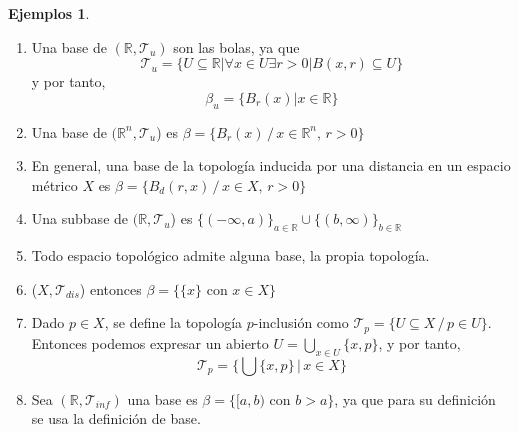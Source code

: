 \documentclass[12pt,twoside]{report}
\newcommand\mc[1]{\mathcal{#1}}
\theoremstyle{azul}
\theoremstyle{azul2}
\theoremstyle{plain}
\theoremstyle{definition}
\newtheorem*{ejes}{Ejemplos}
\theoremstyle{remark}
\begin{document}
\begin{ejes}\:\vspace{-3mm}
     \begin{enumerate}
         \item Una base de $(\mathbb{R}, \mc{T}_u)$ son las bolas, ya que 
         $$\mc{T}_u=\{U \subseteq \mathbb{R}|\forall x \in U \exists r > 0 | B(x,r) \subseteq U \}$$ y por tanto, $$\beta_u=\{B_r(x)|x \in \mathbb{R}\}$$
         \item Una base de $(\mathbb{R}^n,\mc{T}_u$) es $\beta=\{B_r(x)\,/\, x\in \mathbb{R}^n,\, r>0\}$
         \item En general, una base de la topología inducida por una distancia en un espacio métrico $X$ es $\beta=\{B_d(r,x)\,/\, x\in X,\,r>0\}$
         \item Una subbase de $(\mathbb{R},\mathcal{T}_u$) es $\{(-\infty,a)\}_{a\in\mathbb{R}}\cup\{(b,\infty)\}_{b\in\mathbb{R}}$
         \item Todo espacio topológico admite alguna base, la propia topología.
         \item ($X, \mc{T}_{dis}$) entonces $\beta = \{\{x\} \text{ con } x \in X\}$
         \item Dado $p \in X$, se define la topología $p$-inclusión como $\mc{T}_p=\{U\subseteq X\,/\,p\in U\}$. Entonces podemos expresar un abierto $U=\underset{x \in U}{\bigcup}\{ x,p\}$, y por tanto, $$\mc{T}_p=\Big\{ \bigcup \{x,p\} \, | \, x \in X \Big\}$$
         \item Sea $(\mathbb{R}, \mc{T}_{inf})$ una base es $\beta=\{[a,b) \text{ con } b > a\}$, ya que para su definición se usa la definición de base.
     \end{enumerate}
\end{ejes}
\end{document}
